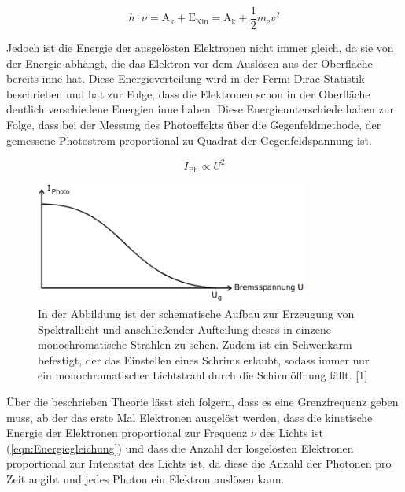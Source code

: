 \documentclass[titlepage = firstcover]{scrartcl}
\begin{document}
        \begin{equation}
            h \cdot \nu = \text{A}_{\text{k}} + \text{E}_{\text{Kin}} = \text{A}_{\text{k}} + \frac{1}{2} m_{\text{e}}v^2
            \label{eqn:Energiegleichung}
        \end{equation}

        \noindent
        Jedoch ist die Energie der ausgelösten Elektronen nicht immer gleich, da sie von der Energie abhängt, die das Elektron vor dem Auslösen aus der Oberfläche bereits inne hat. Diese 
        Energieverteilung wird in der Fermi-Dirac-Statistik beschrieben und hat zur Folge, dass die Elektronen schon in der Oberfläche deutlich verschiedene Energien inne haben. Diese 
        Energieunterschiede haben zur Folge, dass bei der Messung des Photoeffekts über die Gegenfeldmethode, der gemessene Photostrom proportional zu Quadrat der Gegenfeldspannung ist. 

        \begin{equation*}
            I_{\text{Ph}} \propto U^2
        \end{equation*}

        \FloatBarrier

                \begin{figure}[h]
                  \centering
                  \includegraphics[width = 0.8\textwidth]{Bilder/IUTheorie.png}
                  \caption{In der Abbildung ist der schematische Aufbau zur Erzeugung von Spektrallicht und anschließender Aufteilung dieses in einzene monochromatische Strahlen zu sehen. Zudem ist ein Schwenkarm befestigt, der das Einstellen eines Schrims erlaubt, sodass immer nur ein monochromatischer Lichtstrahl durch die Schirmöffnung fällt. [1]}
                  \label{fig:IUTheorie}
                \end{figure}

        \FloatBarrier

        \noindent
        Über die beschrieben Theorie lässt sich folgern, dass es eine Grenzfrequenz geben muss, ab der das erste Mal Elektronen ausgelöst werden, dass die kinetische Energie der Elektronen
        proportional zur Frequenz $\nu$ des Lichts ist (\ref{eqn:Energiegleichung}) und dass die Anzahl der losgelösten Elektronen proportional zur Intensität des Lichts ist, da diese die Anzahl der 
        Photonen pro Zeit angibt und jedes Photon ein Elektron auslösen kann.
\end{document}
